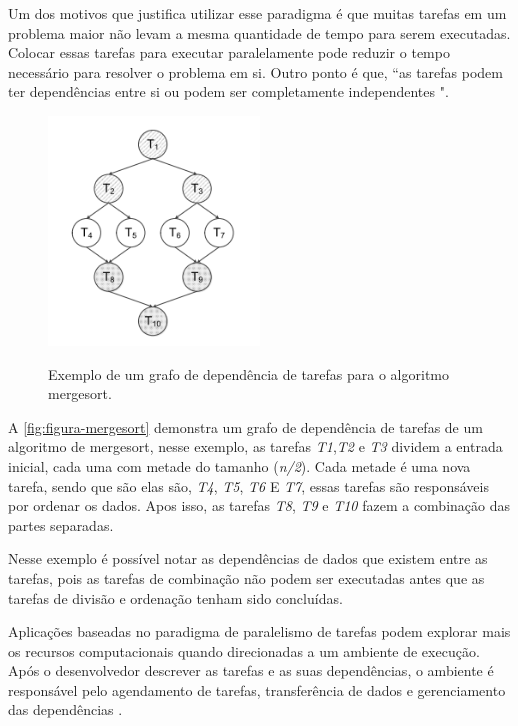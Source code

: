 Um dos motivos que justifica utilizar esse paradigma é que muitas tarefas em um problema maior não levam a mesma quantidade de tempo para serem executadas.
Colocar essas tarefas para executar paralelamente pode reduzir o tempo necessário para resolver o problema em si.
Outro ponto é que, “as tarefas podem ter dependências entre si ou podem ser completamente independentes \cite{pinto2013escalonamento}".

\begin{figure}[!htb]
    \centering
    \caption{Exemplo de um grafo de dependência de tarefas para o algoritmo mergesort.}
    \includegraphics[width=0.5\textwidth]{./dados/figuras/mergesort}
    \label{fig:figura-mergesort}
\end{figure}

A \autoref{fig:figura-mergesort} demonstra um grafo de dependência de tarefas de um algoritmo de mergesort, nesse exemplo, as tarefas \emph{T1},\emph{T2} e \emph{T3} dividem a entrada inicial, cada uma com metade do tamanho (\emph{n/2}).
Cada metade é uma nova tarefa, sendo que são elas são, \emph{T4}, \emph{T5}, \emph{T6} E \emph{T7}, essas tarefas são responsáveis por ordenar os dados.
Apos isso, as tarefas \emph{T8}, \emph{T9} e \emph{T10} fazem a combinação das partes separadas.

Nesse exemplo é possível notar as dependências de dados que existem entre as tarefas, pois as tarefas de combinação não podem ser executadas antes que as tarefas de divisão e ordenação tenham sido concluídas.

Aplicações baseadas no paradigma de paralelismo de tarefas podem explorar mais os recursos computacionais quando direcionadas a um ambiente de execução.
Após o desenvolvedor descrever as tarefas e as suas dependências, o ambiente é responsável pelo agendamento de tarefas, transferência de dados e gerenciamento das dependências \cite{pinto2017visual}.

